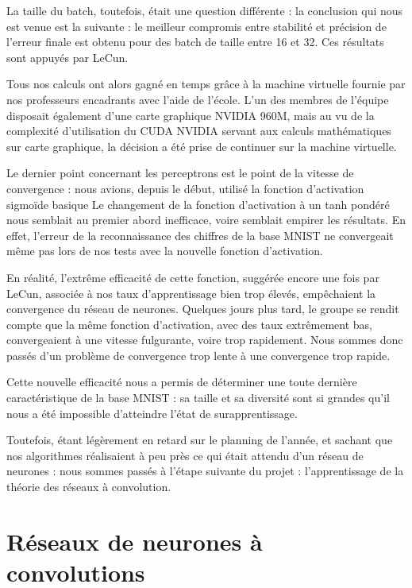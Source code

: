 \documentclass[
    10pt,
    a4paper,
    oneside,
    headinclude,footinclude,
    BCOR=5mm,
]{scrartcl}
\begin{document}
La taille du batch, toutefois, était une question différente : la conclusion qui nous est venue est la suivante : le meilleur compromis entre stabilité et précision de l'erreur finale est obtenu pour des batch de taille entre 16 et 32. Ces résultats sont appuyés par LeCun. 

Tous nos calculs ont alors gagné en temps grâce à la machine virtuelle fournie par nos professeurs encadrants avec l'aide de l'école. L'un des membres de l'équipe disposait également d'une carte graphique NVIDIA 960M, mais au vu de la complexité d'utilisation du CUDA NVIDIA servant aux calculs mathématiques sur carte graphique, la décision a été prise de continuer sur la machine virtuelle.

Le dernier point concernant les perceptrons est le point de la vitesse de convergence : nous avions, depuis le début, utilisé la fonction d'activation sigmoïde basique %
Le changement de la fonction d'activation à un tanh pondéré %
nous semblait au premier abord inefficace, voire semblait empirer les résultats. En effet, l'erreur de la reconnaissance des chiffres de la base MNIST ne convergeait même pas lors de nos tests avec la nouvelle fonction d'activation. 

En réalité, l'extrême efficacité de cette fonction, suggérée encore une fois par LeCun, associée à nos taux d'apprentissage bien trop élevés, empêchaient la convergence du réseau de neurones. Quelques jours plus tard, le groupe se rendit compte que la même fonction d'activation, avec des taux extrêmement bas, convergeaient à une vitesse fulgurante, voire trop rapidement. Nous sommes donc passés d'un problème de convergence trop lente à une convergence trop rapide. 

Cette nouvelle efficacité nous a permis de déterminer une toute dernière caractéristique de la base MNIST : sa taille et sa diversité sont si grandes qu'il nous a été impossible d'atteindre l'état de surapprentissage.

Toutefois, étant légèrement en retard sur le planning de l'année, et sachant que nos algorithmes réalisaient à peu près ce qui était attendu d'un réseau de neurones : nous sommes passés à l'étape suivante du projet : l'apprentissage de la théorie des réseaux à convolution.

\section{Réseaux de neurones à convolutions}
\end{document}
